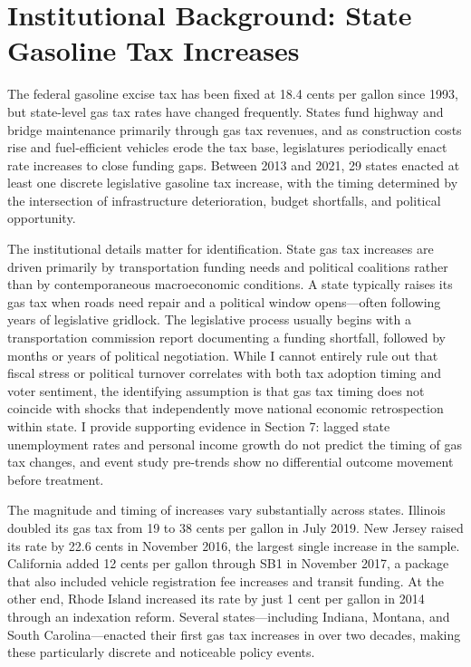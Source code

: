 \documentclass[12pt]{article}
\begin{document}
\section{Institutional Background: State Gasoline Tax Increases}

The federal gasoline excise tax has been fixed at 18.4 cents per gallon since 1993, but state-level gas tax rates have changed frequently. States fund highway and bridge maintenance primarily through gas tax revenues, and as construction costs rise and fuel-efficient vehicles erode the tax base, legislatures periodically enact rate increases to close funding gaps. Between 2013 and 2021, 29 states enacted at least one discrete legislative gasoline tax increase, with the timing determined by the intersection of infrastructure deterioration, budget shortfalls, and political opportunity.

The institutional details matter for identification. State gas tax increases are driven primarily by transportation funding needs and political coalitions rather than by contemporaneous macroeconomic conditions. A state typically raises its gas tax when roads need repair and a political window opens---often following years of legislative gridlock. The legislative process usually begins with a transportation commission report documenting a funding shortfall, followed by months or years of political negotiation. While I cannot entirely rule out that fiscal stress or political turnover correlates with both tax adoption timing and voter sentiment, the identifying assumption is that gas tax timing does not coincide with shocks that independently move national economic retrospection within state. I provide supporting evidence in Section 7: lagged state unemployment rates and personal income growth do not predict the timing of gas tax changes, and event study pre-trends show no differential outcome movement before treatment.

The magnitude and timing of increases vary substantially across states. Illinois doubled its gas tax from 19 to 38 cents per gallon in July 2019. New Jersey raised its rate by 22.6 cents in November 2016, the largest single increase in the sample. California added 12 cents per gallon through SB1 in November 2017, a package that also included vehicle registration fee increases and transit funding. At the other end, Rhode Island increased its rate by just 1 cent per gallon in 2014 through an indexation reform. Several states---including Indiana, Montana, and South Carolina---enacted their first gas tax increases in over two decades, making these particularly discrete and noticeable policy events.
\end{document}
